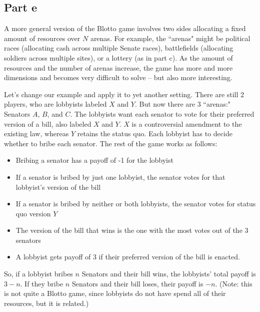 \documentclass[10pt]{article}
\begin{document}
\newpage

\subsection*{Part e}

A more general version of the Blotto game involves two sides allocating a fixed amount of resources over $N$ arenas. For example, the ``arenas" might be political races (allocating cash across multiple Senate races), battlefields (allocating soldiers across multiple sites), or a lottery (as in part c). As the amount of resources and the number of arenas increase, the game has more and more dimensions and becomes very difficult to solve -- but also more interesting.

Let's change our example and apply it to yet another setting. There are still 2 players, who are lobbyists labeled $X$ and $Y$. But now there are 3 ``arenas:" Senators $A$, $B$, and $C$. The lobbyists want each senator to vote for their preferred version of a bill, also labeled $X$ and $Y$. $X$ is a controversial amendment to the existing law, whereas $Y$ retains the status quo. Each lobbyist has to decide whether to bribe each senator. The rest of the game works as follows:
\begin{itemize}
\item Bribing a senator has a payoff of -1 for the lobbyist
\item If a senator is bribed by just one lobbyist, the senator votes for that lobbyist's version of the bill
\item If a senator is bribed by neither or both lobbyists, the senator votes for status quo version $Y$
\item The version of the bill that wins is the one with the most votes out of the 3 senators
\item A lobbyist gets payoff of 3 if their preferred version of the bill is enacted.
\end{itemize}
So, if a lobbyist bribes $n$ Senators and their bill wins, the lobbyists' total payoff is $3-n$. If they bribe $n$ Senators and their bill loses, their payoff is $-n$. (Note: this is not quite a Blotto game, since lobbyists do not have spend all of their resources, but it is related.)
\end{document}
